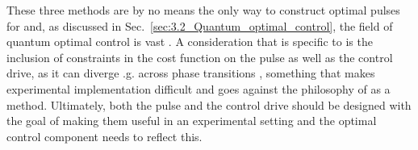 These three methods are by no means the only way to construct optimal pulses for  and, as discussed in Sec.~\ref{sec:3.2_Quantum_optimal_control}, the field of quantum optimal control is vast \cite{koch_quantum_2022}. A consideration that is specific to  is the inclusion of constraints in the cost function on the  pulse as well as the control drive, as it can diverge \@e.g. across phase transitions \cite{hatomura_controlling_2021}, something that makes experimental implementation difficult and goes against the philosophy of  as a method. Ultimately, both the  pulse and the control drive should be designed with the goal of making them useful in an experimental setting and the optimal control component needs to reflect this. 